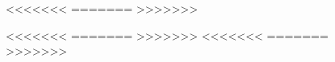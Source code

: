 \documentclass{aa}
\begin{document}
{{{\begin{figure}
{%
<<<<<<<
=======
>>>>>>>

<<<<<<<
=======
>>>>>>>
<<<<<<<
=======
>>>>>>>

}
\end{figure}}}}
\end{document}
